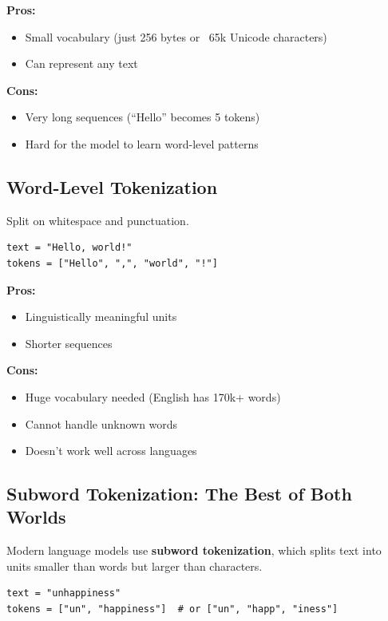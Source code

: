 \textbf{Pros:}
\begin{itemize}
    \item Small vocabulary (just 256 bytes or ~65k Unicode characters)
    \item Can represent any text
\end{itemize}

\textbf{Cons:}
\begin{itemize}
    \item Very long sequences (``Hello'' becomes 5 tokens)
    \item Hard for the model to learn word-level patterns
\end{itemize}

\subsection{Word-Level Tokenization}

Split on whitespace and punctuation.

\begin{lstlisting}[style=python]
text = "Hello, world!"
tokens = ["Hello", ",", "world", "!"]
\end{lstlisting}

\textbf{Pros:}
\begin{itemize}
    \item Linguistically meaningful units
    \item Shorter sequences
\end{itemize}

\textbf{Cons:}
\begin{itemize}
    \item Huge vocabulary needed (English has 170k+ words)
    \item Cannot handle unknown words
    \item Doesn't work well across languages
\end{itemize}

\subsection{Subword Tokenization: The Best of Both Worlds}

Modern language models use \textbf{subword tokenization}, which splits text into units smaller than words but larger than characters.

\begin{lstlisting}[style=python]
text = "unhappiness"
tokens = ["un", "happiness"]  # or ["un", "happ", "iness"]
\end{lstlisting}

